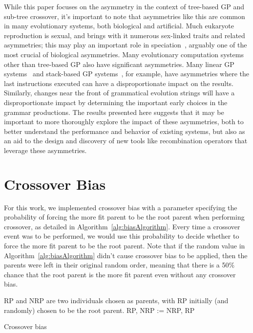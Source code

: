 \documentclass{sig-alternate}
\begin{document}
While this paper focuses on the asymmetry in the context of tree-based GP and sub-tree crossover, it's important to 
note that asymmetries like this are common in many evolutionary systems, both biological and artificial. Much 
eukaryote reproduction is sexual, and brings with it numerous sex-linked traits and related asymmetries; this may
play an important role in speciation~\cite{qvarnstrom2009speciation}, arguably one of the most crucial of 
biological asymmetries.
Many evolutionary computation systems other than tree-based GP also have 
significant asymmetries. Many linear GP systems~\cite{brameier2007linear} and stack-based GP 
systems~\cite{spector:2002:GPEM}, for example, have asymmetries where the last instructions executed can have a 
disproportionate impact on the results. Similarly, changes near the front of grammatical evolution 
\cite{o2003grammatical} strings will have a 
disproportionate impact by determining the important early choices in the grammar productions. 
The results presented here suggests that it may be important to more thoroughly explore the impact of these asymmetries, both to better understand the performance and behavior of existing systems, but also as an aid to the design and discovery of new tools like recombination operators that leverage these asymmetries.

\section{Crossover Bias} \label{sec:XObias}

For this work, we implemented crossover bias with a parameter specifying the probability of forcing 
the more fit parent to be the root parent when performing crossover, as detailed in 
Algorithm~\ref{alg:biasAlgorithm}. Every time a 
crossover event was to be performed, we would use this probability to decide whether to force the 
more fit parent to be the root parent. Note that if the random value in Algorithm~\ref{alg:biasAlgorithm} 
didn't cause crossover bias to be applied, then the parents were left in their original random order, 
meaning that there is a 50\% chance that the root 
parent is the more fit parent even without any crossover bias.

\begin{algorithm}
\begin{algorithmic}
\Require RP and NRP are two individuals chosen as parents, with RP initially (and randomly) chosen to be the root parent.
 
        \State RP, NRP := NRP, RP  
    \EndIf
\EndIf
\end{algorithmic}
\caption{Crossover bias}
\label{alg:biasAlgorithm}
\end{algorithm}
\end{document}
